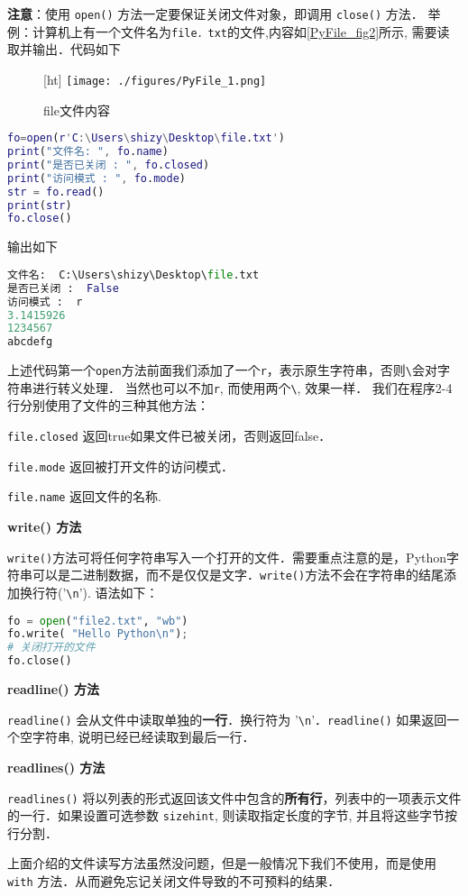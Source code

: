 \textbf{注意}：使用 \verb|open()| 方法一定要保证关闭文件对象，即调用 \verb|close()| 方法． 举例：计算机上有一个文件名为\verb|file．txt|的文件,内容如\autoref{PyFile_fig2}所示, 需要读取并输出．代码如下
\begin{figure}\label{PyFile_fig2}[ht]
\centering
\texttt{[image: ./figures/PyFile\_1.png]}
\caption{file文件内容} \label{PyFile_fig1}
\end{figure}
\begin{lstlisting}[language=matlab]
fo=open(r'C:\Users\shizy\Desktop\file.txt')
print("文件名: ", fo.name)
print("是否已关闭 : ", fo.closed)
print("访问模式 : ", fo.mode)
str = fo.read()
print(str)
fo.close()
\end{lstlisting}
输出如下
\begin{lstlisting}[language=python]
文件名:  C:\Users\shizy\Desktop\file.txt
是否已关闭 :  False
访问模式 :  r
3.1415926
1234567
abcdefg
\end{lstlisting}
上述代码第一个\verb|open|方法前面我们添加了一个\verb|r|，表示原生字符串，否则\verb|\|会对字符串进行转义处理． 当然也可以不加\verb|r|, 而使用两个\verb|\|, 效果一样． 我们在程序2-4行分别使用了文件的三种其他方法：

\verb|file.closed|	返回true如果文件已被关闭，否则返回false．

\verb|file.mode|	返回被打开文件的访问模式．

\verb|file.name|	返回文件的名称.


\textbf{write() 方法}

\verb|write()|方法可将任何字符串写入一个打开的文件．需要重点注意的是，Python字符串可以是二进制数据，而不是仅仅是文字．\verb|write()|方法不会在字符串的结尾添加换行符('\verb|\n|'). 语法如下：
\begin{lstlisting}[language=python]
fo = open("file2.txt", "wb")
fo.write( "Hello Python\n");
# 关闭打开的文件
fo.close()
\end{lstlisting}

\textbf{readline() 方法}

\verb|readline()| 会从文件中读取单独的\textbf{一行}．换行符为 '\verb|\n|'．\verb|readline()| 如果返回一个空字符串, 说明已经已经读取到最后一行．

\textbf{readlines() 方法}

\verb|readlines()| 将以列表的形式返回该文件中包含的\textbf{所有行}，列表中的一项表示文件的一行．如果设置可选参数 \verb|sizehint|, 则读取指定长度的字节, 并且将这些字节按行分割．

上面介绍的文件读写方法虽然没问题，但是一般情况下我们不使用，而是使用\verb|with| 方法．从而避免忘记关闭文件导致的不可预料的结果．


